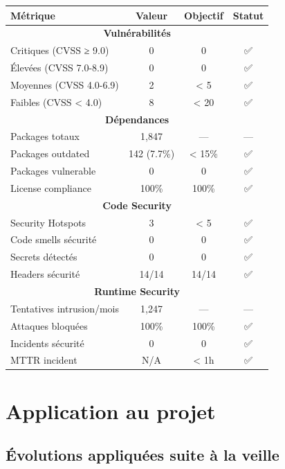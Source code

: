 \begin{tcolorbox}[colback=green!5!white,colframe=green!60!black,title=\textbf{Dashboard sécurité Q4 2024}]
\begin{center}
\begin{tabular}{|l|c|c|c|}
\hline
\textbf{Métrique} & \textbf{Valeur} & \textbf{Objectif} & \textbf{Statut} \\
\hline
\multicolumn{4}{|c|}{\textbf{Vulnérabilités}} \\
\hline
Critiques (CVSS ≥ 9.0) & 0 & 0 & ✅ \\
Élevées (CVSS 7.0-8.9) & 0 & 0 & ✅ \\
Moyennes (CVSS 4.0-6.9) & 2 & < 5 & ✅ \\
Faibles (CVSS < 4.0) & 8 & < 20 & ✅ \\
\hline
\multicolumn{4}{|c|}{\textbf{Dépendances}} \\
\hline
Packages totaux & 1,847 & --- & --- \\
Packages outdated & 142 (7.7\%) & < 15\% & ✅ \\
Packages vulnerable & 0 & 0 & ✅ \\
License compliance & 100\% & 100\% & ✅ \\
\hline
\multicolumn{4}{|c|}{\textbf{Code Security}} \\
\hline
Security Hotspots & 3 & < 5 & ✅ \\
Code smells sécurité & 0 & 0 & ✅ \\
Secrets détectés & 0 & 0 & ✅ \\
Headers sécurité & 14/14 & 14/14 & ✅ \\
\hline
\multicolumn{4}{|c|}{\textbf{Runtime Security}} \\
\hline
Tentatives intrusion/mois & 1,247 & --- & --- \\
Attaques bloquées & 100\% & 100\% & ✅ \\
Incidents sécurité & 0 & 0 & ✅ \\
MTTR incident & N/A & < 1h & ✅ \\
\hline
\end{tabular}
\end{center}
\end{tcolorbox}

\section{Application au projet}

\subsection{Évolutions appliquées suite à la veille}

